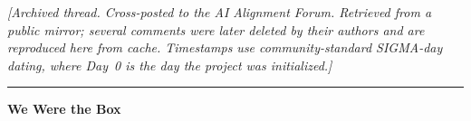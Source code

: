 %

\providecommand{\forumby}[3]{\noindent\textbf{#1}\ {\footnotesize\itshape[#2\ \textbullet\ #3]}\par\nobreak\vspace{1pt}}

\newenvironment{wtbthread}{%
  \begin{list}{}{%
    \setlength{\leftmargin}{1.8em}%
    \setlength{\rightmargin}{0pt}%
    \setlength{\labelwidth}{0pt}%
    \setlength{\labelsep}{0pt}%
    \setlength{\itemindent}{0pt}%
    \setlength{\listparindent}{0pt}%
    \setlength{\topsep}{4pt}%
    \setlength{\parsep}{3pt}%
  }\item\relax}{\end{list}}

\begin{center}
\small\itshape
[Archived thread. Cross-posted to the AI Alignment Forum. Retrieved from a public mirror; several comments were later deleted by their authors and are reproduced here from cache. Timestamps use community-standard SIGMA-day dating, where Day~0 is the day the project was initialized.]
\end{center}

\begin{center}\rule{0.3\linewidth}{0.4pt}\end{center}

{\large\bfseries We Were the Box}

\medskip

